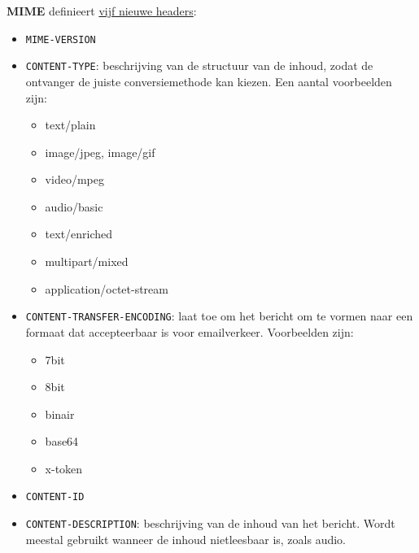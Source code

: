 \documentclass{report}
\begin{document}
	\textbf{MIME} definieert \underline{vijf nieuwe headers}:
	\begin{itemize}
		\item[\info] \texttt{MIME-VERSION}
		\item[\info] \texttt{CONTENT-TYPE}: beschrijving van de structuur van de inhoud, zodat de ontvanger de juiste conversiemethode kan kiezen. Een aantal voorbeelden zijn: \begin{itemize}
			\item text/plain
			\item image/jpeg, image/gif
			\item video/mpeg
			\item audio/basic
			\item text/enriched
			\item multipart/mixed
			\item application/octet-stream
		\end{itemize}
		\item[\info] \texttt{CONTENT-TRANSFER-ENCODING}: laat toe om het bericht om te vormen naar een formaat dat accepteerbaar is voor emailverkeer. Voorbeelden zijn:
		\begin{itemize}
			\item 7bit
			\item 8bit
			\item binair
			\item base64
			\item x-token
		\end{itemize}
		\item[\info] \texttt{CONTENT-ID}
		\item[\info] \texttt{CONTENT-DESCRIPTION}: beschrijving van de inhoud van het bericht. Wordt meestal gebruikt wanneer de inhoud nietleesbaar is, zoals audio.
	\end{itemize}
\end{document}
